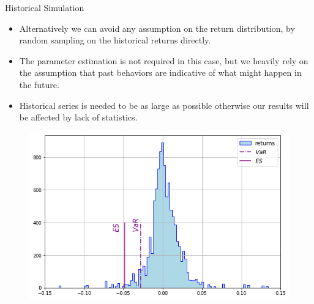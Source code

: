 \documentclass{beamer}
\begin{document}
\begin{frame}{Historical Simulation}
  \begin{itemize}
  \item Alternatively we can avoid any assumption on the return distribution, by random sampling on the historical returns directly. 
  \item The parameter estimation is not required in this case, but we heavily rely on the assumption that past behaviors are indicative of what might happen in the future. 
  \item Historical series is needed to be as large as possible otherwise our results will be affected by lack of statistics. 
  \end{itemize}
  \begin{figure}[h]
    \begin{center}
      \includegraphics[width=0.4\linewidth]{historical_var}
    \end{center}
  \end{figure}
\end{frame}

\end{document}
